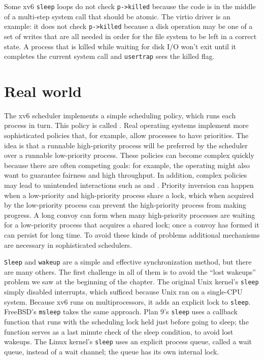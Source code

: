 Some xv6 
\lstinline{sleep}
loops do not check
\lstinline{p->killed} 
because the code is in the middle of a multi-step
system call that should be atomic.
The virtio driver
is an example: it does not check
\lstinline{p->killed}
because a disk operation may be one of a set of
writes that are all needed in order for the file system to
be left in a correct state.
A process that is killed while waiting for disk I/O won't
exit until it completes the current system call and
\lstinline{usertrap} sees the killed flag.
\section{Real world}

The xv6 scheduler implements a simple scheduling policy, which runs each process
in turn.  This policy is called
.
Real operating systems implement more sophisticated policies that, for example,
allow processes to have priorities.  The idea is that a runnable high-priority process
will be preferred by the scheduler over a runnable low-priority process.   These
policies can become complex quickly because there are often competing goals: for
example, the operating might also want to guarantee fairness and
high throughput.  In addition, complex policies may lead to unintended
interactions such as
and 
.
Priority inversion can happen when a low-priority and high-priority process
share a lock, which when acquired by the low-priority process can prevent the
high-priority process from making progress.  A long convoy can form when many
high-priority processes are waiting for a low-priority process that acquires a
shared lock; once a convoy has formed it can persist for long time.
To avoid these kinds of problems additional mechanisms are necessary in
sophisticated schedulers.

\lstinline{Sleep}
and
\lstinline{wakeup}
are a simple and effective synchronization method,
but there are many others.
The first challenge in all of them is to
avoid the ``lost wakeups'' problem we saw at the
beginning of the chapter.
The original Unix kernel's
\lstinline{sleep}
simply disabled interrupts,
which sufficed because Unix ran on a single-CPU system.
Because xv6 runs on multiprocessors,
it adds an explicit lock to
\lstinline{sleep}.
FreeBSD's
\lstinline{msleep}
takes the same approach.
Plan 9's 
\lstinline{sleep}
uses a callback function that runs with the scheduling
lock held just before going to sleep;
the function serves as a last minute check
of the sleep condition, to avoid lost wakeups.
The Linux kernel's
\lstinline{sleep}
uses an explicit process queue, called a wait queue, instead of
a wait channel; the queue has its own internal lock.

